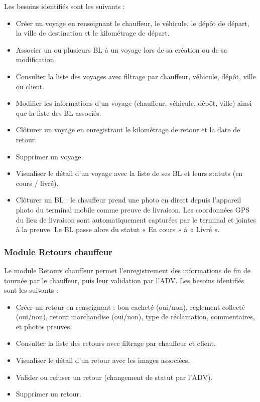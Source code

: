 \documentclass[12pt,a4paper]{article}
\begin{document}
    Les besoins identifiés sont les suivants :
    \begin{itemize}[leftmargin=1.2em]
    \item Créer un voyage en renseignant le chauffeur, le véhicule, le dépôt de départ, la ville de destination et le kilométrage de départ.
    \item Associer un ou plusieurs BL à un voyage lors de sa création ou de sa modification.
    \item Consulter la liste des voyages avec filtrage par chauffeur, véhicule, dépôt, ville ou client.
    \item Modifier les informations d'un voyage (chauffeur, véhicule, dépôt, ville) ainsi que la liste des BL associés.
    \item Clôturer un voyage en enregistrant le kilométrage de retour et la date de retour.
    \item Supprimer un voyage.
    \item Visualiser le détail d'un voyage avec la liste de ses BL et leurs statuts (en cours / livré).
    \item Clôturer un BL : le chauffeur prend une photo en direct depuis l'appareil photo du terminal mobile comme preuve de livraison. Les coordonnées GPS du lieu de livraison sont automatiquement capturées par le terminal et jointes à la preuve. Le BL passe alors du statut « En cours » à « Livré ».
    \end{itemize}

    \subsubsection{Module Retours chauffeur}
    Le module Retours chauffeur permet l'enregistrement des informations de fin de tournée par le chauffeur, puis leur validation par l'ADV. Les besoins identifiés sont les suivants :
    \begin{itemize}[leftmargin=1.2em]
    \item Créer un retour en renseignant : bon cacheté (oui/non), règlement collecté (oui/non), retour marchandise (oui/non), type de réclamation, commentaires, et photos preuves.
    \item Consulter la liste des retours avec filtrage par chauffeur et client.
    \item Visualiser le détail d'un retour avec les images associées.
    \item Valider ou refuser un retour (changement de statut par l'ADV).
    \item Supprimer un retour.
    \end{itemize}
\end{document}
